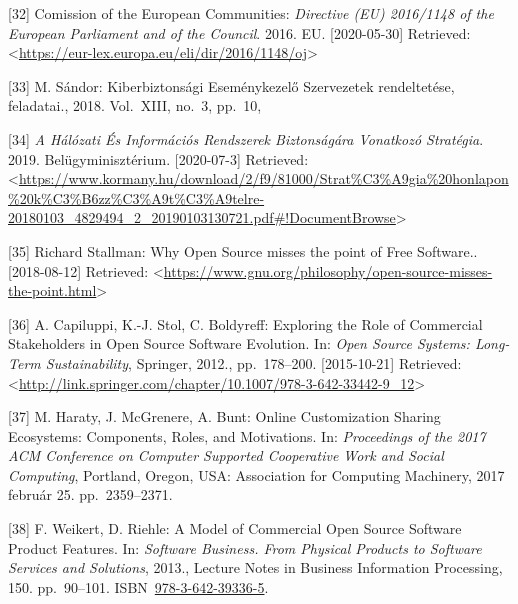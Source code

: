 \documentclass[12pt,magyar,a4paper,oneside]{scrreprt}
\newenvironment{cslreferences}%
  {}%
  {\par}
\begin{document}
\begin{cslreferences}
\leavevmode\hypertarget{ref-comission_of_the_european_communities_directive_2016}{}%
{[}32{]} Comission of the European Communities: \emph{Directive (EU)
2016/1148 of the European Parliament and of the Council}. 2016. EU.
{[}2020-05-30{]} Retrieved:
\textless{}\url{https://eur-lex.europa.eu/eli/dir/2016/1148/oj}\textgreater{}

\leavevmode\hypertarget{ref-sandor_kiberbiztonsagi_2018}{}%
{[}33{]} M. Sándor: Kiberbiztonsági Eseménykezelő Szervezetek
rendeltetése, feladatai., 2018. Vol.~XIII, no.~3, pp.~10,

\leavevmode\hypertarget{ref-noauthor_halozati_2019}{}%
{[}34{]} \emph{A Hálózati És Információs Rendszerek Biztonságára
Vonatkozó Stratégia}. 2019. Belügyminisztérium. {[}2020-07-3{]}
Retrieved:
\textless{}\url{https://www.kormany.hu/download/2/f9/81000/Strat\%C3\%A9gia\%20honlapon\%20k\%C3\%B6zz\%C3\%A9t\%C3\%A9telre-20180103_4829494_2_20190103130721.pdf\#!DocumentBrowse}\textgreater{}

\leavevmode\hypertarget{ref-richard_stallman_why_nodate}{}%
{[}35{]} Richard Stallman: Why Open Source misses the point of Free
Software.. {[}2018-08-12{]} Retrieved:
\textless{}\url{https://www.gnu.org/philosophy/open-source-misses-the-point.html}\textgreater{}

\leavevmode\hypertarget{ref-capiluppi_exploring_2012}{}%
{[}36{]} A. Capiluppi, K.-J. Stol, C. Boldyreff: Exploring the Role of
Commercial Stakeholders in Open Source Software Evolution. In:
\emph{Open Source Systems: Long-Term Sustainability}, Springer, 2012.,
pp.~178--200. {[}2015-10-21{]} Retrieved:
\textless{}\url{http://link.springer.com/chapter/10.1007/978-3-642-33442-9_12}\textgreater{}

\leavevmode\hypertarget{ref-haraty_online_2017}{}%
{[}37{]} M. Haraty, J. McGrenere, A. Bunt: Online Customization Sharing
Ecosystems: Components, Roles, and Motivations. In: \emph{Proceedings of
the 2017 ACM Conference on Computer Supported Cooperative Work and
Social Computing}, Portland, Oregon, USA: Association for Computing
Machinery, 2017 február 25. pp.~2359--2371.

\leavevmode\hypertarget{ref-weikert_model_2013}{}%
{[}38{]} F. Weikert, D. Riehle: A Model of Commercial Open Source
Software Product Features. In: \emph{Software Business. From Physical
Products to Software Services and Solutions}, 2013., Lecture Notes in
Business Information Processing, 150. pp.~90--101.
ISBN~\href{https://worldcat.org/isbn/978-3-642-39336-5}{978-3-642-39336-5}.


\end{cslreferences}
\end{document}
